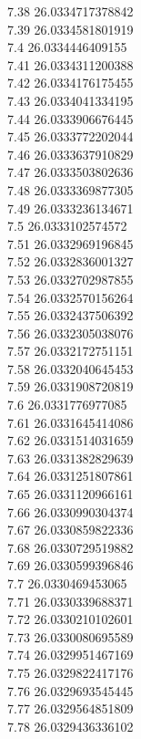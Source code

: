 {7.38	26.0334717378842\\
7.39	26.0334581801919\\
7.4	26.0334446409155\\
7.41	26.0334311200388\\
7.42	26.0334176175455\\
7.43	26.0334041334195\\
7.44	26.0333906676445\\
7.45	26.0333772202044\\
7.46	26.0333637910829\\
7.47	26.0333503802636\\
7.48	26.0333369877305\\
7.49	26.0333236134671\\
7.5	26.0333102574572\\
7.51	26.0332969196845\\
7.52	26.0332836001327\\
7.53	26.0332702987855\\
7.54	26.0332570156264\\
7.55	26.0332437506392\\
7.56	26.0332305038076\\
7.57	26.0332172751151\\
7.58	26.0332040645453\\
7.59	26.0331908720819\\
7.6	26.0331776977085\\
7.61	26.0331645414086\\
7.62	26.0331514031659\\
7.63	26.0331382829639\\
7.64	26.0331251807861\\
7.65	26.0331120966161\\
7.66	26.0330990304374\\
7.67	26.0330859822336\\
7.68	26.0330729519882\\
7.69	26.0330599396846\\
7.7	26.0330469453065\\
7.71	26.0330339688371\\
7.72	26.0330210102601\\
7.73	26.0330080695589\\
7.74	26.0329951467169\\
7.75	26.0329822417176\\
7.76	26.0329693545445\\
7.77	26.0329564851809\\
7.78	26.0329436336102\\
}
